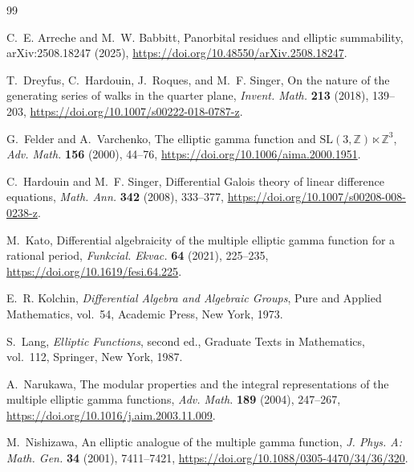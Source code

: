\documentclass[11pt]{article}
\numberwithin{equation}{section}
\theoremstyle{definition}
\theoremstyle{remark}
\newcommand{\Z}{\mathbb Z}
\begin{document}
\begin{thebibliography}{99}
\raggedright

C.~E. Arreche and M.~W. Babbitt,
\newblock Panorbital residues and elliptic summability,
\newblock arXiv:2508.18247 (2025),
\newblock \url{https://doi.org/10.48550/arXiv.2508.18247}.

T.~Dreyfus, C.~Hardouin, J.~Roques, and M.~F. Singer,
\newblock On the nature of the generating series of walks in the quarter plane,
\newblock \emph{Invent. Math.} \textbf{213} (2018), 139--203,
\newblock \url{https://doi.org/10.1007/s00222-018-0787-z}.

G.~Felder and A.~Varchenko,
\newblock The elliptic gamma function and
$\mathrm{SL}(3,\Z)\ltimes\Z^3$,
\newblock \emph{Adv. Math.} \textbf{156} (2000), 44--76,
\newblock \url{https://doi.org/10.1006/aima.2000.1951}.

C.~Hardouin and M.~F. Singer,
\newblock Differential Galois theory of linear difference equations,
\newblock \emph{Math. Ann.} \textbf{342} (2008), 333--377,
\newblock \url{https://doi.org/10.1007/s00208-008-0238-z}.

M.~Kato,
\newblock Differential algebraicity of the multiple elliptic gamma function
for a rational period,
\newblock \emph{Funkcial. Ekvac.} \textbf{64} (2021), 225--235,
\newblock \url{https://doi.org/10.1619/fesi.64.225}.

E.~R. Kolchin,
\newblock \emph{Differential Algebra and Algebraic Groups},
\newblock Pure and Applied Mathematics, vol.~54, Academic Press, New York,
1973.

S.~Lang,
\newblock \emph{Elliptic Functions}, second ed.,
\newblock Graduate Texts in Mathematics, vol.~112, Springer, New York, 1987.

A.~Narukawa,
\newblock The modular properties and the integral representations of the
multiple elliptic gamma functions,
\newblock \emph{Adv. Math.} \textbf{189} (2004), 247--267,
\newblock \url{https://doi.org/10.1016/j.aim.2003.11.009}.

M.~Nishizawa,
\newblock An elliptic analogue of the multiple gamma function,
\newblock \emph{J. Phys. A: Math. Gen.} \textbf{34} (2001), 7411--7421,
\newblock \url{https://doi.org/10.1088/0305-4470/34/36/320}.

\end{thebibliography}
\end{document}
